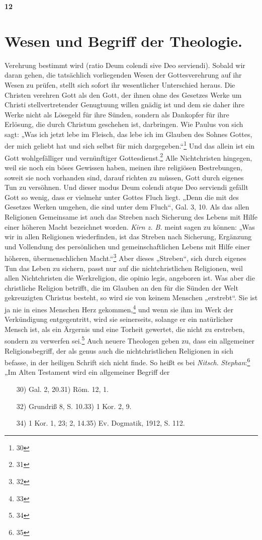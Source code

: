 \hfill\textbf{12}\section*{Wesen und Begriff der Theologie.}
Verehrung bestimmt wird (ratio Deum colendi sive Deo serviendi). Sobald wir daran gehen, die tatsächlich vorliegenden Wesen der Gottesverehrung auf ihr Wesen zu prüfen, stellt sich sofort ihr wesentlicher Unterschied heraus. Die Christen verehren Gott als den Gott, der ihnen ohne des Gesetzes Werke um Christi stellvertretender Genugtuung willen gnädig ist und dem sie daher ihre Werke nicht als Lösegeld für ihre Sünden, sondern als Dankopfer für ihre Erlösung, die durch Christum geschehen ist, darbringen. Wie Paulus von sich sagt: „Was ich jetzt lebe im Fleisch, das lebe ich im Glauben des Sohnes Gottes, der mich geliebt hat und sich selbst für mich dargegeben.“\footnote{30} Und das allein ist ein Gott wohlgefälliger und vernünftiger Gottesdienst.\footnote{31}
Alle Nichtchristen hingegen, weil sie noch ein böses Gewissen haben, meinen ihre religiösen Bestrebungen, soweit sie noch vorhanden sind, darauf richten zu müssen, Gott durch eigenes Tun zu versöhnen. Und dieser modus Deum colendi atque Deo serviendi gefällt Gott so wenig, dass er vielmehr unter Gottes Fluch liegt. „Denn die mit des Gesetzes Werken umgehen, die sind unter dem Fluch“, Gal. 3, 10.
Als das allen Religionen Gemeinsame ist auch das Streben nach Sicherung des Lebens mit Hilfe einer höheren Macht bezeichnet worden. \textit{Kirn z. B.} meint sagen zu können: „Was wir in allen Religionen wiederfinden, ist das Streben nach Sicherung, Ergänzung und Vollendung des persönlichen und gemeinschaftlichen Lebens mit Hilfe einer höheren, übermenschlichen Macht.“\footnote{32} Aber dieses „Streben“, sich durch eigenes Tun das Leben zu sichern, passt nur auf die nichtchristlichen Religionen, weil allen Nichtchristen die Werkreligion, die opinio legis, angeboren ist. Was aber die christliche Religion betrifft, die im Glauben an den für die Sünden der Welt gekreuzigten Christus besteht, so wird sie von keinem Menschen „erstrebt“. Sie ist ja nie in eines Menschen Herz gekommen,\footnote{33} und wenn sie ihm im Werk der Verkündigung entgegentritt, wird sie seinerseits, solange er ein natürlicher Mensch ist, als ein Ärgernis und eine Torheit gewertet, die nicht zu erstreben, sondern zu verwerfen sei.\footnote{34} Auch neuere Theologen geben zu, dass ein allgemeiner Religionsbegriff, der als genus auch die nichtchristlichen Religionen in sich befasse, in der heiligen Schrift sich nicht finde. So heißt es bei \textit{Nitsch}. \textit{Stephan}:\footnote{35} „Im Alten Testament wird ein allgemeiner Begriff der
{\small
\begin{enumerate}
\item[30)] Gal. 2, 20.\hfill 31) Röm. 12, 1.
\item[32)] Grundriß 8, S. 10.\hfill 33) 1 Kor. 2, 9.
\item[34)] 1 Kor. 1, 23; 2, 14.\hfill 35) Ev. Dogmatik, 1912, S. 112.
\end{enumerate}
}